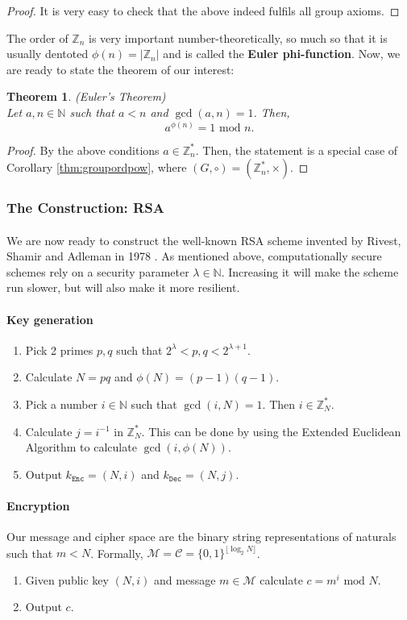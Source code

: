 \documentclass{article}
\newtheorem{theorem}{Theorem}[section]
\theoremstyle{definition}
\newcommand{\Enc}{\texttt{Enc}}
\newcommand{\Dec}{\texttt{Dec}}
\newcommand{\M}{\mathcal{M}}
\renewcommand{\C}{\mathcal{C}}
\newcommand{\Int}{\mathbb{Z}}
\newcommand{\Nat}{\mathbb{N}}
\renewcommand{\mod}{\,\,\text{mod}\,\,}
\begin{document}
\begin{proof}
  It is very easy to check that the above indeed fulfils all group axioms.
\end{proof}
The order of $\Int_n$ is very important number-theoretically, so much so that it
is usually dentoted $\phi(n) = |\Int_n|$ and is called the \textbf{Euler phi-function}.
Now, we are ready to state the theorem of our interest:
\begin{theorem}{(Euler's Theorem)}\\
  \label{thm:eulersthm}
  Let $a, n \in \Nat$ such that $a < n$ and $\gcd(a, n) = 1$. Then,
  \[
    a^{\phi(n)} = 1 \mod n.
  \]
\end{theorem}
\begin{proof}
  By the above conditions $a \in \Int^*_n$. Then, the statement is a special
  case of Corollary \ref{thm:groupordpow}, where $(G, \circ) = (\Int^*_n, \times)$.
\end{proof}
\subsubsection{The Construction: RSA}
\paragraph{}
We are now ready to construct the well-known RSA scheme invented by Rivest,
Shamir and Adleman in 1978 \cite{rivest1978method}. As mentioned above, computationally secure schemes rely on
a security parameter $\lambda \in \Nat$. Increasing it will make the scheme run
slower, but will also make it more resilient.
\paragraph{Key generation}
\begin{enumerate}
\item Pick 2 primes $p, q$ such that $2^\lambda < p, q <
2^{\lambda + 1}$.
\item Calculate $N = pq$ and $\phi(N) = (p - 1)(q - 1)$.
\item Pick a number $i \in \Nat$ such that $\gcd(i, N) = 1$. Then $i \in
  \Int^*_N$.
\item Calculate $j = i^{-1}$ in $\Int^*_N$. This can be done by using the
  Extended Euclidean Algorithm to calculate $\gcd(i, \phi(N))$.
\item Output $k_\Enc = (N, i)$ and $k_\Dec = (N, j)$.
\end{enumerate}
\paragraph{Encryption}
Our message and cipher space are the binary string representations of naturals such that $m
< N$. Formally, $\M = \C = \{0, 1\}^{\lfloor {\log_2N} \rfloor}$.
\begin{enumerate}
\item Given public key $(N, i)$ and message $m \in \M$ calculate $c = m^i \mod N$.
\item Output $c$.
\end{enumerate}
\end{document}
